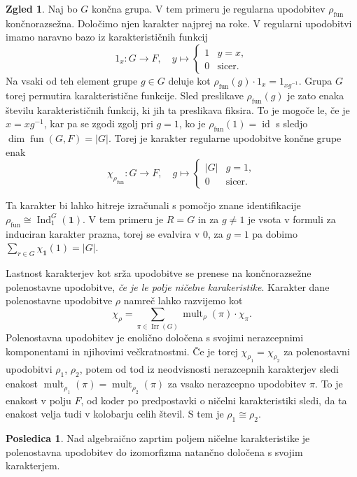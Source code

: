 \documentclass[11pt]{book}
\def\11{\mathbf{1}}
\DeclareMathOperator\Ind{Ind}
\DeclareMathOperator\mult{mult}
\DeclareMathOperator\Irr{Irr}
\DeclareMathOperator\fun{fun}
\DeclareMathOperator\id{id}
\theoremstyle{definition}
\theoremstyle{zgled}
\newtheorem*{zgled}{Zgled}
\theoremstyle{odprtproblem}
\theoremstyle{domacanaloga}
\theoremstyle{izrek}
\newtheorem*{posledica}{Posledica}
\begin{document}
\begin{zgled}
    Naj bo $G$ končna grupa. V tem primeru je regularna upodobitev $\rho_{\fun}$ končnorazsežna. Določimo njen karakter najprej na roke. V regularni upodobitvi imamo naravno bazo iz karakterističnih funkcij
    \[
        1_{x} \colon G \to F, \quad
        y \mapsto \begin{cases} 1 & y = x, \\ 0 & \text{sicer.} \end{cases}
    \]
    Na vsaki od teh element grupe $g \in G$ deluje kot $\rho_{\fun}(g) \cdot 1_x = 1_{x g^{-1}}$. Grupa $G$ torej permutira karakteristične funkcije. Sled preslikave $\rho_{\fun}(g)$ je zato enaka številu karakterističnih funkcij, ki jih ta preslikava fiksira. To je mogoče le, če je $x = x g^{-1}$, kar pa se zgodi zgolj pri $g = 1$, ko je $\rho_{\fun}(1) = \id$ s sledjo $\dim \fun(G,F) = |G|$. Torej je karakter regularne upodobitve končne grupe enak
    \[
        \chi_{\rho_{\fun}} \colon G \to F, \quad
        g \mapsto \begin{cases} |G| & g = 1, \\ 0 & \text{sicer.} \end{cases}
    \]
    
    Ta karakter bi lahko hitreje izračunali s pomočjo znane identifikacije $\rho_{\fun} \cong \Ind^G_1(\11)$. V tem primeru je $R = G$ in za $g \neq 1$ je vsota v formuli za induciran karakter prazna, torej se evalvira v $0$, za $g = 1$ pa dobimo $\sum_{r \in G} \chi_{\11}(1) = |G|$.
\end{zgled}

Lastnost karakterjev kot srža upodobitve se prenese na končnorazsežne polenostavne upodobitve, \emph{če je le polje ničelne karakeristike}. Karakter dane polenostavne upodobitve $\rho$ namreč lahko razvijemo kot
\[
    \textstyle \chi_{\rho} = \sum_{\pi \in \Irr(G)} \mult_{\rho}(\pi) \cdot \chi_{\pi}.
\]
Polenostavna upodobitev je enolično določena s svojimi nerazcepnimi komponentami in njihovimi večkratnostmi. Če je torej $\chi_{\rho_1} = \chi_{\rho_2}$ za polenostavni upodobitvi $\rho_1$, $\rho_2$, potem od tod iz neodvisnosti nerazcepnih karakterjev sledi enakost $\mult_{\rho_1}(\pi) = \mult_{\rho_2}(\pi)$ za vsako nerazcepno upodobitev $\pi$. To je enakost v polju $F$, od koder po predpostavki o ničelni karakteristiki sledi, da ta enakost velja tudi v kolobarju celih števil. S tem je $\rho_1 \cong \rho_2$.

\begin{posledica}
Nad algebraično zaprtim poljem ničelne karakteristike je polenostavna upodobitev do izomorfizma natančno določena s svojim karakterjem.
\end{posledica}
\end{document}
